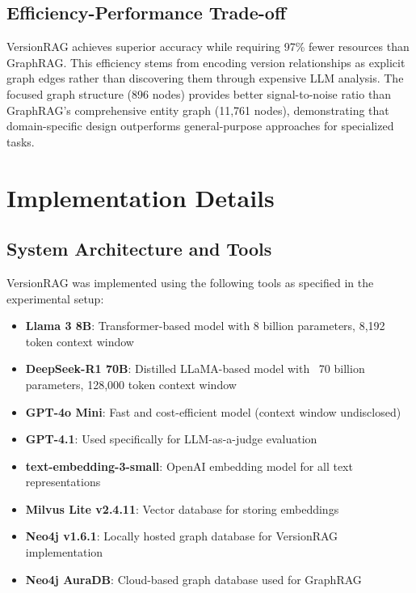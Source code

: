 \subsection{Efficiency-Performance Trade-off}

VersionRAG achieves superior accuracy while requiring 97\% fewer resources than GraphRAG. This efficiency stems from encoding version relationships as explicit graph edges rather than discovering them through expensive LLM analysis. The focused graph structure (896 nodes) provides better signal-to-noise ratio than GraphRAG's comprehensive entity graph (11,761 nodes), demonstrating that domain-specific design outperforms general-purpose approaches for specialized tasks.





\newpage

\section{Implementation Details}
\label{app:implementation_details}

\subsection{System Architecture and Tools}

VersionRAG was implemented using the following tools as specified in the experimental setup:

\begin{itemize}
    \item \textbf{Llama 3 8B}: Transformer-based model with 8 billion parameters, 8,192 token context window
    \item \textbf{DeepSeek-R1 70B}: Distilled LLaMA-based model with ~70 billion parameters, 128,000 token context window
    \item \textbf{GPT-4o Mini}: Fast and cost-efficient model (context window undisclosed)
    \item \textbf{GPT-4.1}: Used specifically for LLM-as-a-judge evaluation
    \item \textbf{text-embedding-3-small}: OpenAI embedding model for all text representations
    \item \textbf{Milvus Lite v2.4.11}: Vector database for storing embeddings
    \item \textbf{Neo4j v1.6.1}: Locally hosted graph database for VersionRAG implementation
    \item \textbf{Neo4j AuraDB}: Cloud-based graph database used for GraphRAG
\end{itemize}

